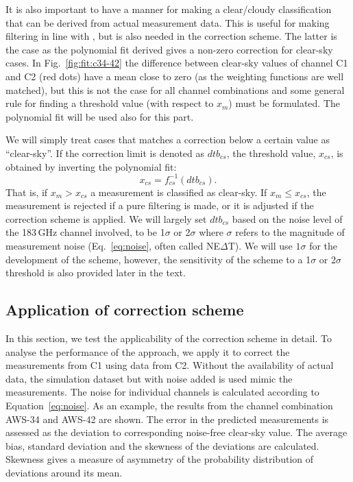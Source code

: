 \documentclass[12pt]{article}
\begin{document}
It is also important to have a manner for making a clear/cloudy classification
that can be derived from actual measurement data. This is useful for making
filtering in line with \citet{rekha2012potential}, but is also needed in the
correction scheme. The latter is the case as the polynomial fit derived gives a
non-zero correction for clear-sky cases. In Fig.~\ref{fig:fit:c34-42} the
difference between clear-sky values of channel C1 and C2 (red dots) have a mean
close to zero (as the weighting functions are well matched), but this is not
the case for all channel combinations and some general rule for finding a
threshold value (with respect to $x_m$) must be formulated. The polynomial fit
will be used also for this part.

We will simply treat cases that matches a correction below a certain value as
``clear-sky''. If the correction limit is denoted as $dtb_{cs}$, the threshold
value, $x_{cs}$, is obtained by inverting the polynomial fit:
\begin{equation}
x_{cs} = f_{cs}^{-1}(dtb_{cs}).
\label{eq:dtb}
\end{equation}
That is, if $x_m>x_{cs}$ a measurement is classified as clear-sky. If
$x_m\leq x_{cs}$, the measurement is rejected if a pure filtering is made, or
it is adjusted if the correction scheme is applied. We will largely set
$dtb_{cs}$ based on the noise level of the 183\,GHz channel involved, to be
1$\sigma$ or 2$\sigma$ where $\sigma$ refers to the magnitude of measurement
noise (Eq.~\ref{eq:noise}, often called NE$\Delta$T). We will use $1\sigma$ for
the development of the scheme, however, the sensitivity of the scheme to
a 1$\sigma$ or 2$\sigma$ threshold is also provided later in the text.



\subsection{Application of correction scheme}
%
In this section, we test the applicability of the correction scheme in detail.
To analyse the performance of the approach, we apply it to correct the
measurements from C1 using data from C2. Without the availability of actual
data, the simulation dataset but with noise added is used mimic the
measurements. The noise for individual channels is calculated according to
Equation~\ref{eq:noise}. As an example, the results from the channel
combination AWS-34 and AWS-42 are shown. The error in the predicted
measurements is assessed as the deviation to corresponding noise-free clear-sky
value. The average bias, standard deviation and the skewness of the
deviations are calculated. Skewness gives a measure of asymmetry of the
probability distribution of deviations around its mean.
\end{document}
